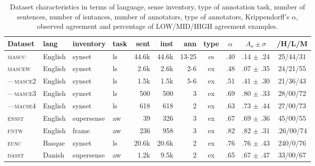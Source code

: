 \documentclass[11pt,a4paper]{article}
\begin{document}
\begin{table}[Ht!]

\begin{center}
  \begin{tabular}{llllrrrcccc}
  \toprule 

Dataset& lang & inventory & task & sent & inst & ann & type & $\alpha$ & $A_o\pm\sigma$ & /H/L/M\\ 
\midrule 

\textsc{mascc} & English & synset & ls & 44.6k & 44.6k & 13-25 & cs & .40 & .14 $\pm$ .24 & 25/44/31\\
\textsc{mascew} & English & synset & ls & 2.6k & 2.6k & 2-6 & ex & .48 & .07 $\pm$ .35 & 24/21/55\\
---\textsc{masce2} & English & synset & ls & 1.5k & 1.5k & 5-6 & ex & .51 & .41 $\pm$ .30 & 21/36/43\\
---\textsc{masce3} & English & synset & ls & 500 & 500 & 3 & ex & .69 & .80 $\pm$ .33 & 28/00/72\\
---\textsc{macse4} & English & synset & ls & 618 & 618 & 2 & ex & .63 & .73 $\pm$ .44 & 27/00/73\\
\textsc{ensst} & English & supersense & aw & 39 & 326 & 3 & ex & .67 & .69 $\pm$ .36 & 45/00/55\\
\textsc{fntw} & English & frame & aw & 236 & 958 & 3 & ex & .82 & .82 $\pm$ .31 & .26/00/74\\

\textsc{eusc} & Basque & synset & ls & 20.6k & 20.6k & 2 & ex & .76 & .76 $\pm$ .43 & 240/0/76\\
\textsc{dasst} & Danish & supersense & aw & 1.2k & 9.5k & 2 & ex & .65 & .67 $\pm$ .47 & 33/00/67\\


\bottomrule

  \end{tabular}  
\end{center}
\caption{Dataset characteristics \label{tab:data} in terms of language, sense inventory, type of annotation task, number of sentences, number of isntances, number of annotators, type of annotators, Krippendorff's $\alpha$, observed agreement and percentage of LOW/MID/HIGH agreement examples.}
\end{table} 
\end{document}
